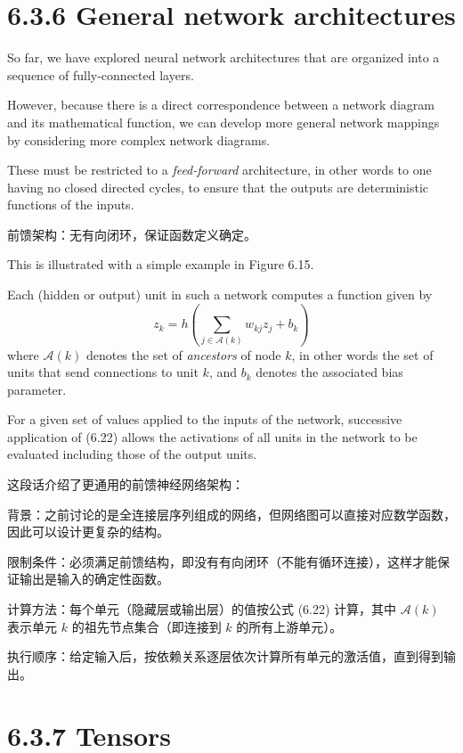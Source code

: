 \documentclass{article}
\begin{document}
\section{6.3.6 General network architectures}

So far, we have explored neural network architectures that are organized into a sequence of fully-connected layers. 

However, because there is a direct correspondence between a network diagram and its mathematical function, we can develop more general network mappings by considering more complex network diagrams. 

These must be restricted to a \emph{feed-forward} architecture, in other words to one having no closed directed cycles, to ensure that the outputs are deterministic functions of the inputs. 

{\color{red}
前馈架构：无有向闭环，保证函数定义确定。
}

This is illustrated with a simple example in Figure 6.15. 

Each (hidden or output) unit in such a network computes a function given by
\begin{equation}
    z_k = h\left(\sum_{j \in \mathcal{A}(k)} w_{kj} z_j + b_k\right)
    \tag{6.22}
\end{equation}
where $\mathcal{A}(k)$ denotes the set of \emph{ancestors} of node $k$, in other words the set of units that send connections to unit $k$, and $b_k$ denotes the associated bias parameter. 

For a given set of values applied to the inputs of the network, successive application of (6.22) allows the activations of all units in the network to be evaluated including those of the output units.

{\color{red}
这段话介绍了更通用的前馈神经网络架构：

背景：之前讨论的是全连接层序列组成的网络，但网络图可以直接对应数学函数，因此可以设计更复杂的结构。

限制条件：必须满足前馈结构，即没有有向闭环（不能有循环连接），这样才能保证输出是输入的确定性函数。

计算方法：每个单元（隐藏层或输出层）的值按公式 (6.22) 计算，其中 \(\mathcal{A}(k)\) 表示单元 \(k\) 的祖先节点集合（即连接到 \(k\) 的所有上游单元）。

执行顺序：给定输入后，按依赖关系逐层依次计算所有单元的激活值，直到得到输出。
}

\section{6.3.7 Tensors}
\end{document}
